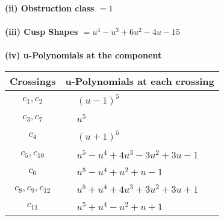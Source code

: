 \documentclass[1p]{elsarticle_modified}
\theoremstyle{definition}
\begin{document}
\flushleft \textbf{(ii) Obstruction class $= 1$}\\~\\
\flushleft \textbf{(iii) Cusp Shapes $= u^4- u^3+6 u^2-4 u-15$}\\~\\
\newpage\renewcommand{\arraystretch}{1}
\flushleft \textbf{(iv) u-Polynomials at the component}\newline \\
\begin{tabular}{m{50pt}|m{274pt}}
Crossings & \hspace{64pt}u-Polynomials at each crossing \\
\hline $$\begin{aligned}c_{1},c_{2}\end{aligned}$$&$\begin{aligned}
&(u-1)^5
\end{aligned}$\\
\hline $$\begin{aligned}c_{3},c_{7}\end{aligned}$$&$\begin{aligned}
&u^5
\end{aligned}$\\
\hline $$\begin{aligned}c_{4}\end{aligned}$$&$\begin{aligned}
&(u+1)^5
\end{aligned}$\\
\hline $$\begin{aligned}c_{5},c_{10}\end{aligned}$$&$\begin{aligned}
&u^5- u^4+4 u^3-3 u^2+3 u-1
\end{aligned}$\\
\hline $$\begin{aligned}c_{6}\end{aligned}$$&$\begin{aligned}
&u^5- u^4+u^2+u-1
\end{aligned}$\\
\hline $$\begin{aligned}c_{8},c_{9},c_{12}\end{aligned}$$&$\begin{aligned}
&u^5+u^4+4 u^3+3 u^2+3 u+1
\end{aligned}$\\
\hline $$\begin{aligned}c_{11}\end{aligned}$$&$\begin{aligned}
&u^5+u^4- u^2+u+1
\end{aligned}$\\
\hline
\end{tabular}\\~\\
\end{document}
